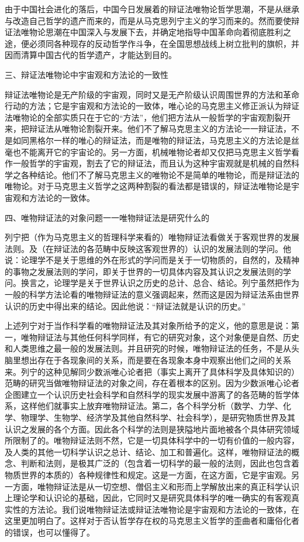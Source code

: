 由于中国社会进化的落后，中国今日发展着的辩证法唯物论哲学思潮，不是从继承与改造自己哲学的遗产而来的，而是从马克思列宁主义的学习而来的。然而要使辩证法唯物论思潮在中国深入与发展下去，并确定地指导中国革命向着彻底胜利之途，便必须同各种现存的反动哲学作斗争，在全国思想战线上树立批判的旗帜，并因而清算中国古代的哲学遗产，才能达到目的。

三、辩证法唯物论中宇宙观和方法论的一致性

辩证法唯物论是无产阶级的宇宙观，同时又是无产阶级认识周围世界的方法和革命行动的方法；它是宇宙观和方法论的一致体，唯心论的马克思主义修正派认为辩证法唯物论的全部实质只在于它的“方法”，他们把方法从一般哲学的宇宙观割裂开来，把辩证法从唯物论割裂开来。他们不了解马克思主义的方法论一一辩证法，不是如同黑格尔一样的唯心的辩证法，而是唯物的辩证法，马克思主义的方法论是丝毫也不能离开它的宇宙论的。另一方面，机械唯物论者却又仅把马克思主义哲学看作一般哲学的宇宙观，割去了它的辩证法，而且认为这种宇宙观就是机械的自然科学之各种结论。他们不了解马克思主义的唯物论不是简单的唯物论，而是辩证法的唯物论。对于马克思主义哲学之这两种割裂的看法都是错误的，辩证法唯物论是宇宙观和方法论的一致体。

四、唯物辩证法的对象问题一一唯物辩证法是研究什么的


列宁把（作为马克思主义的哲理科学来看的）唯物辩证法看做关于客观世界的发展法则。及（在辩证法的各范畴中反映这客观世界的）认识的发展法则的学问。他说：论理学不是关于思维的外在形式的学问而是关于一切物质的，自然的，及精神的事物之发展法则的学问，即关于世界的一切具体内容及其认识之发展法则的学问。换言之，论理学是关于世界认识之历史的总计、总合、结论。列宁虽然把作为一般的科学方法论看的唯物辩证法的意义强调起来，然而这是因为辩证法系由世界认识的历史中得出来的结论。因此他说：“辩证法就是认识的历史。”

上述列宁对于当作科学看的唯物辩证法及其对象所给予的定义，他的意思是说：第一，唯物辩证法与其他任何科学同样，有它的研究对象，这个对象便是自然、历史和人类思维之最一般的发展法则。并且研究的时候，唯物辩证法的任务，不是从头脑里想出存在于各现象间的关系，而是要在各现象本身中观察出他们之间的关系来。列宁的这种见解同少数派唯心论者把（事实上离开了具体科学及具体知识的）范畴的研究当做唯物辩证法的对象之间，存在着根本的区别。因为少数派唯心论者企图建立一个认识历史社会科学和自然科学的现实发展中游离了的各范畴的哲学体系，这样他们就事实上放弃唯物辩证法。第二，各个科学分析（数学、力学、化学、物理学、生物学、经济学及其他自然科学、社会科学），是研究物质世界及其认识之发展的各个方面。因此各个科学的法则是狭隘地片面地被各个具体研究领域所限制了的。唯物辩证法则不然，它是一切具体科学中的一切有价值的一般内容，及人类的其他一切科学认识之总计、结论、加工和普遍化。这样，唯物辩证法的概念、判断和法则，是极其广泛的（包含着一切科学的最一般的法则，因此也包含着物质世界的本质的）各种规律性和规定。这是一方面，在这方面，它是宇宙观。另一方面，唯物辩证法是从一切空想、僧侣主义和形而上学解放出来的真正科学认识上理论学和认识论的基础，因此，它同时又是研究具体科学的唯一确实的有客观真实性的方法论。我们说唯物辩证法或辩证法唯物论是宇宙观和方法论的一致体，在这里更加明白了。这样对于否认哲学存在权的马克思主义哲学的歪曲者和庸俗化者的错误，也可以懂得了。

